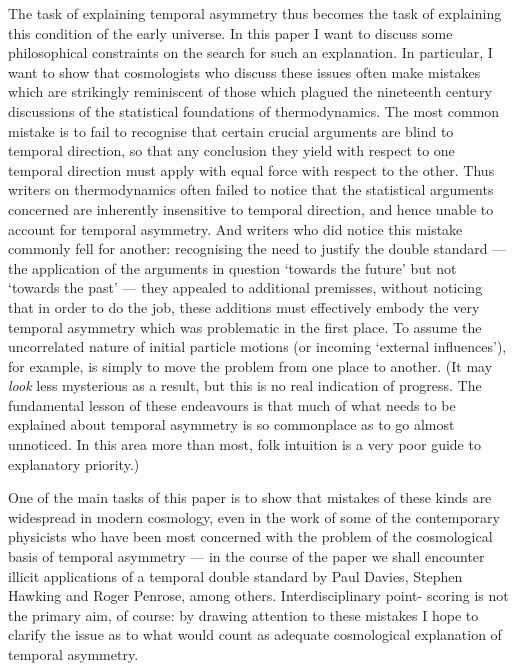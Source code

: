 \documentclass{article}
\begin{document}
The task of explaining temporal asymmetry thus becomes the task of
explaining this condition of the early universe. In this paper I want to
discuss some philosophical constraints on the search for such an
explanation. In particular, I want to show that cosmologists who discuss
these issues often make mistakes which are strikingly reminiscent of
those which plagued the nineteenth century discussions of the
statistical foundations of thermodynamics. The most common mistake is to
fail to recognise that certain crucial arguments are blind to temporal
direction, so that any conclusion they yield with respect to one
temporal direction must apply with equal force with respect to the
other. Thus writers on thermodynamics often failed to notice that the
statistical arguments concerned are inherently insensitive to temporal
direction, and hence unable to account for temporal asymmetry. And
writers who did notice this mistake commonly fell for another:
recognising the need to justify the double standard --- the application
of the arguments in question `towards the future' but not `towards the
past' --- they appealed to additional premisses, without noticing that
in order to do the job, these additions must effectively embody the very
temporal asymmetry which was problematic in the first place. To assume
the uncorrelated nature of initial particle motions (or incoming
`external influences'), for example, is simply to move the problem from
one place to another. (It may \emph{look} less mysterious as a result,
but this is no real indication of progress. The fundamental lesson of
these endeavours is that much of what needs to be explained about
temporal asymmetry is so commonplace as to go almost unnoticed. In this
area more than most, folk intuition is a very poor guide to explanatory
priority.)

One of the main tasks of this paper is to show that mistakes of these
kinds are widespread in modern cosmology, even in the work of some of
the contemporary physicists who have been most concerned with the
problem of the cosmological basis of temporal asymmetry --- in the
course of the paper we shall encounter illicit applications of a
temporal double standard by Paul Davies, Stephen Hawking and Roger
Penrose, among others. Interdisciplinary point- scoring is not the
primary aim, of course: by drawing attention to these mistakes I hope to
clarify the issue as to what would count as adequate cosmological
explanation of temporal asymmetry.
\end{document}
